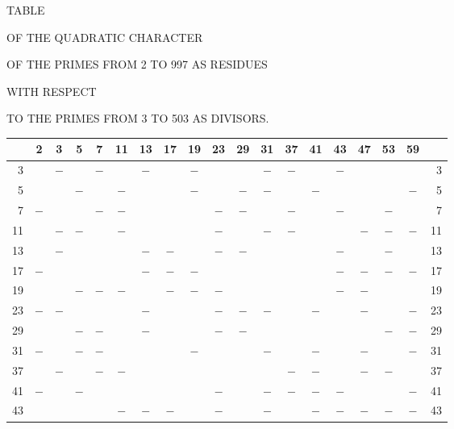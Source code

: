 \clearpage
{}%
\renewcommand{\BookRunningTitle}{Table of the Quadratic Character}
\begin{center}
{\Large TABLE}\par\bigskip
OF THE QUADRATIC CHARACTER\par\bigskip
OF THE PRIMES FROM 2 TO 997 AS RESIDUES\par\bigskip
WITH RESPECT\par\bigskip
TO THE PRIMES FROM 3 TO 503 AS DIVISORS.
\end{center}
\clearpage

%
\begin{center}\begingroup\fontsize{8}{10.5}\selectfont\setlength{\tabcolsep}{2pt}
\begin{tabular}{r|c|c|c|c|c|c|c|c|c|c|c|c|c|c|c|c|c|r}
\hline
 & 2 & 3 & 5 & 7 & 11 & 13 & 17 & 19 & 23 & 29 & 31 & 37 & 41 & 43 & 47 & 53 & 59 & \\
\hline
3 &  & $-$ &  & $-$ &  & $-$ &  & $-$ &  &  & $-$ & $-$ &  & $-$ &  &  &  & 3\\
5 &  &  & $-$ &  & $-$ &  &  & $-$ &  & $-$ & $-$ &  & $-$ &  &  &  & $-$ & 5\\
7 & $-$ &  &  & $-$ & $-$ &  &  &  & $-$ & $-$ &  & $-$ &  & $-$ &  & $-$ &  & 7\\
11 &  & $-$ & $-$ &  & $-$ &  &  &  & $-$ &  & $-$ & $-$ &  &  & $-$ & $-$ & $-$ & 11\\
13 &  & $-$ &  &  &  & $-$ & $-$ &  & $-$ & $-$ &  &  &  & $-$ &  & $-$ &  & 13\\
17 & $-$ &  &  &  &  & $-$ & $-$ & $-$ &  &  &  &  &  & $-$ & $-$ & $-$ & $-$ & 17\\
19 &  &  & $-$ & $-$ & $-$ &  & $-$ & $-$ & $-$ &  &  &  &  & $-$ & $-$ &  &  & 19\\
23 & $-$ & $-$ &  &  &  & $-$ &  &  & $-$ & $-$ & $-$ &  & $-$ &  & $-$ &  & $-$ & 23\\
29 &  &  & $-$ & $-$ &  & $-$ &  &  & $-$ & $-$ &  &  &  &  &  & $-$ & $-$ & 29\\
31 & $-$ &  & $-$ & $-$ &  &  &  & $-$ &  &  & $-$ &  & $-$ &  & $-$ &  & $-$ & 31\\
37 &  & $-$ &  & $-$ & $-$ &  &  &  &  &  &  & $-$ & $-$ &  & $-$ & $-$ &  & 37\\
41 & $-$ &  & $-$ &  &  &  &  &  & $-$ &  & $-$ & $-$ & $-$ & $-$ &  &  & $-$ & 41\\
43 &  &  &  &  & $-$ & $-$ & $-$ &  & $-$ &  & $-$ &  & $-$ & $-$ & $-$ & $-$ & $-$ & 43\\

\end{tabular}
\end{center}
